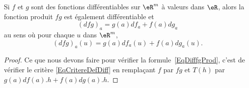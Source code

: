 \begin{lemma}		\label{LemDiffProsuid}
	Si \( f\) et \( g\) sont des fonctions différentiables sur \( \eR^m\) à valeurs dans \( \eR\), alors la fonction produit \( fg\) est également différentiable et
	\begin{equation}		\label{EqDifffgProd}
		(dfg)_a=g(a)df_a+f(a)dg_a
	\end{equation}
	au sens où pour chaque \( u\) dans \( \eR^m\),
	\begin{equation}
		(dfg)_a(u)=g(a)df_a(u)+f(a)dg_a(u).
	\end{equation}
\end{lemma}

\begin{proof}
	Ce que nous devons faire pour vérifier la formule~\ref{EqDifffgProd}, c'est de vérifier le critère \eqref{EqCritereDefDiff} en remplaçant \( f\) par \( fg\) et \( T(h)\) par \( g(a)df(a).h+f(a)dg(a).h\).


\end{proof}
